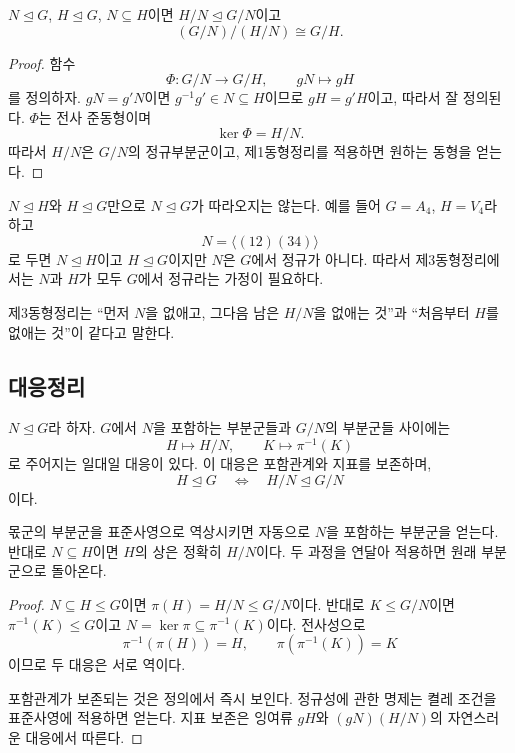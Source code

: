\begin{theorem}[제3동형정리]
$N\trianglelefteq G$, $H\trianglelefteq G$, $N\subseteq H$이면 $H/N\trianglelefteq G/N$이고
\[
  (G/N)/(H/N)\cong G/H.
\]
\end{theorem}

\begin{proof}
함수
\[
  \Phi:G/N\to G/H,
  \qquad gN\mapsto gH
\]
를 정의하자. $gN=g'N$이면 $g^{-1}g'\in N\subseteq H$이므로 $gH=g'H$이고, 따라서 잘 정의된다. $\Phi$는 전사 준동형이며
\[
  \ker\Phi=H/N.
\]
따라서 $H/N$은 $G/N$의 정규부분군이고, 제1동형정리를 적용하면 원하는 동형을 얻는다.
\end{proof}

\begin{pitfall}
$N\trianglelefteq H$와 $H\trianglelefteq G$만으로 $N\trianglelefteq G$가 따라오지는 않는다. 예를 들어 $G=A_4$, $H=V_4$라 하고
\[
  N=\langle(12)(34)\rangle
\]
로 두면 $N\trianglelefteq H$이고 $H\trianglelefteq G$이지만 $N$은 $G$에서 정규가 아니다. 따라서 제3동형정리에서는 $N$과 $H$가 모두 $G$에서 정규라는 가정이 필요하다.
\end{pitfall}

제3동형정리는 ``먼저 $N$을 없애고, 그다음 남은 $H/N$을 없애는 것''과 ``처음부터 $H$를 없애는 것''이 같다고 말한다.

\subsection{대응정리}

\begin{theorem}
$N\trianglelefteq G$라 하자. $G$에서 $N$을 포함하는 부분군들과 $G/N$의 부분군들 사이에는
\[
  H\longmapsto H/N,
  \qquad
  K\longmapsto\pi^{-1}(K)
\]
로 주어지는 일대일 대응이 있다. 이 대응은 포함관계와 지표를 보존하며,
\[
  H\trianglelefteq G
  \quad\Longleftrightarrow\quad
  H/N\trianglelefteq G/N
\]
이다.
\end{theorem}

\begin{proofidea}
몫군의 부분군을 표준사영으로 역상시키면 자동으로 $N$을 포함하는 부분군을 얻는다. 반대로 $N\subseteq H$이면 $H$의 상은 정확히 $H/N$이다. 두 과정을 연달아 적용하면 원래 부분군으로 돌아온다.
\end{proofidea}

\begin{proof}
$N\subseteq H\le G$이면 $\pi(H)=H/N\le G/N$이다. 반대로 $K\le G/N$이면 $\pi^{-1}(K)\le G$이고 $N=\ker\pi\subseteq\pi^{-1}(K)$이다. 전사성으로
\[
  \pi^{-1}(\pi(H))=H,
  \qquad
  \pi(\pi^{-1}(K))=K
\]
이므로 두 대응은 서로 역이다.

포함관계가 보존되는 것은 정의에서 즉시 보인다. 정규성에 관한 명제는 켤레 조건을 표준사영에 적용하면 얻는다. 지표 보존은 잉여류 $gH$와 $(gN)(H/N)$의 자연스러운 대응에서 따른다.
\end{proof}

